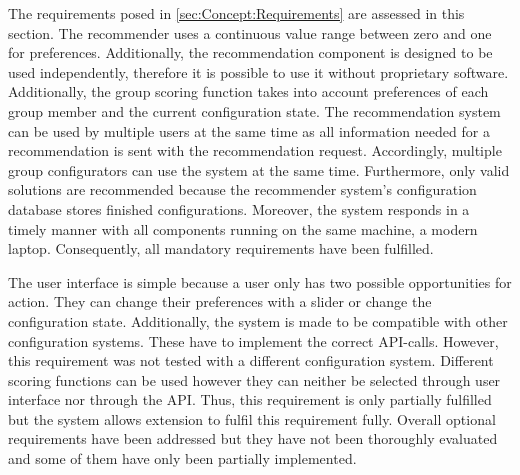 The requirements posed in \autoref{sec:Concept:Requirements} are assessed in this section. The recommender uses a continuous value range between zero and one for preferences. Additionally, the recommendation component is designed to be used independently, therefore it is possible to use it without proprietary software.
Additionally, the group scoring function takes into account preferences of each group member and the current configuration state. The recommendation system can be used by multiple users at the same time as all information needed for a recommendation is sent with the recommendation request. Accordingly, multiple group configurators can use the system at the same time. Furthermore, only valid solutions are recommended because the recommender system's configuration database stores finished configurations. Moreover, the system responds in a timely manner with all components running on the same machine, a modern laptop.
Consequently, all mandatory requirements have been fulfilled.

The user interface is simple because a user only has two possible opportunities for action. They can change their preferences with a slider or change the configuration state. Additionally, the system is made to be compatible with other configuration systems. These have to implement the correct API-calls. However, this requirement was not tested with a different configuration system. Different scoring functions can be used however they can neither be selected through user interface nor through the API. Thus, this requirement is only partially fulfilled but the system allows extension to fulfil this requirement fully.
Overall optional requirements have been addressed but they have not been thoroughly evaluated and some of them have only been partially implemented.